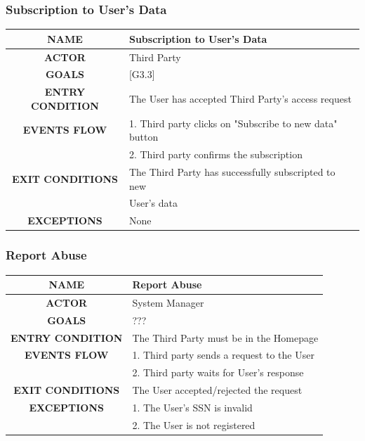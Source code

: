 \documentclass[12pt,a4paper]{article}
\begin{document}
		\subsubsection{Subscription to User's Data}
		\begin{center}
			\begin{tabular}{| c | l |}
				\hline
				\textbf{NAME} & Subscription to User's Data \\
				\hline
				\textbf{ACTOR} & Third Party \\
				\hline
				\textbf{GOALS} & [G3.3] \\
				\hline
				\textbf{ENTRY CONDITION} & The User has accepted Third Party's access request \\ \hline
				\textbf{EVENTS FLOW}  &
				1. Third party clicks on "Subscribe to new data" button\\
				&2. Third party confirms the subscription\\
				\hline
				\textbf{EXIT CONDITIONS}  & The Third Party has successfully subscripted to new\\
				& User's data \\ \hline
				\textbf{EXCEPTIONS} & 
				None\\
				\hline
			\end{tabular}
		\end{center}
	
		\subsubsection{Report Abuse}
		\begin{center}
			\begin{tabular}{| c | l |}
				\hline
				\textbf{NAME} & Report Abuse \\
				\hline
				\textbf{ACTOR} & System Manager \\
				\hline
				\textbf{GOALS} & ??? \\
				\hline
				\textbf{ENTRY CONDITION} & The Third Party must be in the Homepage \\ \hline
				\textbf{EVENTS FLOW}  &
				1. Third party sends a request to the User\\
				&2. Third party waits for User's response\\
				\hline
				\textbf{EXIT CONDITIONS}  & The User accepted/rejected the request \\ \hline
				\textbf{EXCEPTIONS} & 
				1. The User's SSN is invalid\\
				&2. The User is not registered\\
				\hline
			\end{tabular}
		\end{center}
\end{document}

